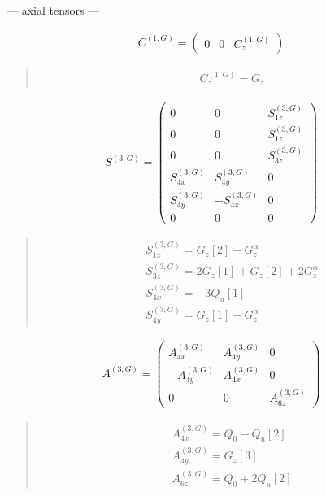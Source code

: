 \documentclass[fleqn,10pt]{jsarticle}
\begin{document}
\newpage
\begin{center}\LARGE --- axial tensors ---\end{center}
\begin{align*}
C^{(1,G)} = \begin{pmatrix} 0 & 0 & C^{(1,G)}_{z} \end{pmatrix}
\end{align*}
\begin{quote}
\begin{align*}
& C^{(1,G)}_{z} = G_{z}
\end{align*}
\end{quote}
\begin{align*}
S^{(3,G)} = \begin{pmatrix} 0 & 0 & S^{(3,G)}_{1z} \\ 0 & 0 & S^{(3,G)}_{1z} \\ 0 & 0 & S^{(3,G)}_{3z} \\ S^{(3,G)}_{4x} & S^{(3,G)}_{4y} & 0 \\ S^{(3,G)}_{4y} & - S^{(3,G)}_{4x} & 0 \\ 0 & 0 & 0 \end{pmatrix}
\end{align*}
\begin{quote}
\begin{align*}
& S^{(3,G)}_{1z} = G_{z}[2] - G_{z}^{\alpha} \\
& S^{(3,G)}_{3z} = 2 G_{z}[1] + G_{z}[2] + 2 G_{z}^{\alpha} \\
& S^{(3,G)}_{4x} = - 3 Q_{u}[1] \\
& S^{(3,G)}_{4y} = G_{z}[1] - G_{z}^{\alpha}
\end{align*}
\end{quote}
\begin{align*}
A^{(3,G)} = \begin{pmatrix} A^{(3,G)}_{4x} & A^{(3,G)}_{4y} & 0 \\ - A^{(3,G)}_{4y} & A^{(3,G)}_{4x} & 0 \\ 0 & 0 & A^{(3,G)}_{6z} \end{pmatrix}
\end{align*}
\begin{quote}
\begin{align*}
& A^{(3,G)}_{4x} = Q_{0} - Q_{u}[2] \\
& A^{(3,G)}_{4y} = G_{z}[3] \\
& A^{(3,G)}_{6z} = Q_{0} + 2 Q_{u}[2]
\end{align*}
\end{quote}
\end{document}
